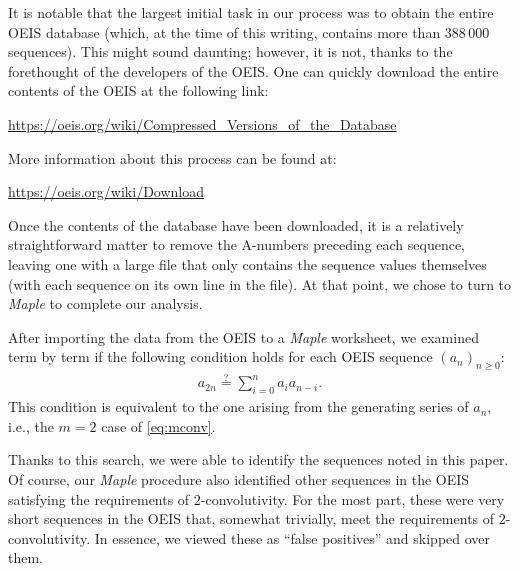 \documentclass[12pt,reqno]{amsart}
\numberwithin{equation}{section}
\theoremstyle{plain}
\theoremstyle{definition}
\theoremstyle{named}
\begin{document}
It is notable that the largest initial task in our process was to obtain the entire OEIS database (which, at the time of this writing, contains more than $388\,000$ sequences).  This might sound daunting; however, it is not, thanks to the forethought of the developers of the OEIS.  One can quickly download the entire contents of the OEIS at the following link:
\begin{center}
	\url{https://oeis.org/wiki/Compressed_Versions_of_the_Database}
\end{center}
More information about this process can be found at:
\begin{center}
	\url{https://oeis.org/wiki/Download}
\end{center}

Once the contents of the database have been downloaded, it is a relatively straightforward matter to remove the A-numbers preceding each sequence, leaving one with a large file that only contains the sequence values themselves (with each sequence on its own line in the file). At that point, we chose to turn to \textit{Maple} to complete our analysis.  

After importing the data from the OEIS to a \textit{Maple} worksheet, we examined term by term if the following condition holds for each OEIS sequence $(a_n)_{n\ge 0}$:
\begin{align*}
	a_{2n} \overset{?}{=} \sum_{i=0}^n a_ia_{n-i}.
\end{align*}
This condition is equivalent to the one arising from the generating series of $a_n$, i.e., the $m=2$ case of \eqref{eq:mconv}.

Thanks to this search, we were able to identify the sequences noted in this paper. Of course, our \emph{Maple} procedure also identified other sequences in the OEIS satisfying the requirements of $2$-convolutivity.  For the most part, these were very short sequences in the OEIS that, somewhat trivially, meet the requirements of $2$-convolutivity.  In essence, we viewed these as ``false positives'' and skipped over them.  
\end{document}
